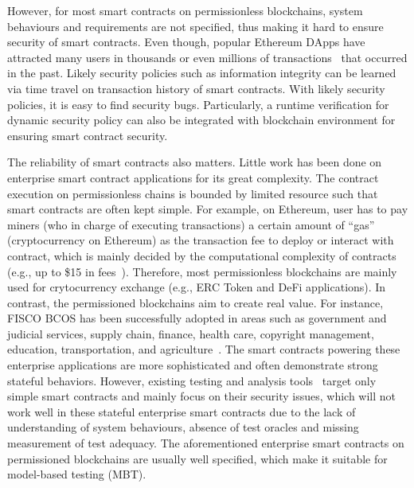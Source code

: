 However, for most smart contracts on permissionless blockchains, system behaviours and requirements are not specified, 
thus making it hard to ensure security of smart contracts.
Even though, popular Ethereum DApps have attracted many users in thousands or even millions of transactions~\cite{Etherscan} that occurred in the past.
Likely security policies such as information integrity can be learned via time travel on transaction history of smart contracts.
With likely security policies, 
it is easy to find security bugs.
Particularly, a runtime verification for dynamic security policy can also be integrated with blockchain environment for ensuring smart contract security.

The reliability of smart contracts also matters.
Little work has been done on enterprise smart contract applications for its great complexity.
The contract execution on permissionless chains is bounded by limited resource such that smart contracts are often kept simple.
For example, on Ethereum, user has to pay miners (who in charge of executing transactions) a certain amount of ``gas'' (cryptocurrency on Ethereum) as the transaction fee to deploy or interact with contract, which is mainly decided by the computational complexity of contracts (e.g., up to \$15 in fees~\cite{gas-fee}).
Therefore, most permissionless blockchains are mainly used for crytocurrency exchange (e.g., ERC Token and DeFi applications).
In contrast, the permissioned blockchains aim to create real value.
For instance, FISCO BCOS has been successfully adopted in areas such as government and judicial services, supply chain, finance, health care, copyright management, education, transportation, and agriculture~\cite{fisco}.
The smart contracts powering these enterprise applications are more sophisticated and often demonstrate strong stateful behaviors.
However, existing testing and analysis tools~\cite{jiang2018contractfuzzer,oyente,securify,SmartCheck,wang2019vultron} target only simple smart contracts and mainly focus on their security issues, which will not work well in these stateful enterprise smart contracts due to the lack of understanding of system behaviours, absence of test oracles and missing measurement of test adequacy.
The aforementioned enterprise smart contracts on permissioned blockchains are usually well specified, which make it suitable for model-based testing (MBT).

